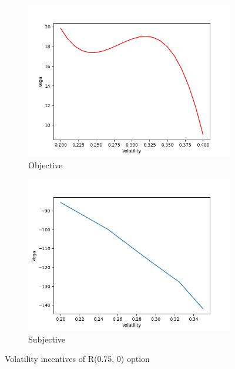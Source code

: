 \vspace*{15pt}
\begin{figure}[H]
    \centering
    \begin{subfigure}{0.45\textwidth}
        \centering
        \includegraphics[width=\textwidth]{fig/4/r_vega_obj.png}
        \caption{Objective}
        \label{fig:r_vega_obj}
    \end{subfigure}
    \hfill
    \begin{subfigure}{0.45\textwidth}
        \centering
        \includegraphics[width=\textwidth]{fig/4/r_vega_subj.png}
        \caption{Subjective}
        \label{fig:r_vega_subj}
    \end{subfigure}
    \caption{Volatility incentives of R(0.75, 0) option}
    \label{fig:r_vega_both}
\end{figure}
\vspace*{15pt}
